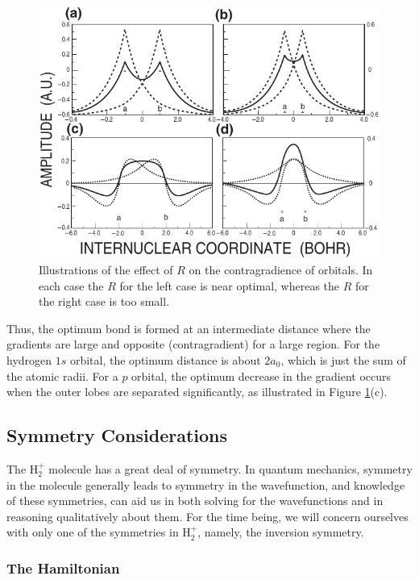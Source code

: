 \begin{figure}
\begin{center}
\includegraphics[scale=0.75]{fig2-11}
\end{center}
\caption{Illustrations of the effect of $R$ on the contragradience of
  orbitals. In each case the $R$ for the left case is near optimal,
  whereas the $R$ for the right case is too small.}
\label{fig2-11}
\end{figure}

Thus, the optimum bond is formed at an intermediate distance where the 
gradients are large and opposite (contragradient) for a large region. For 
the hydrogen $1s$ orbital, the optimum distance is about $2a_0$, which 
is just the sum of the atomic radii. For a $p$ orbital,
the optimum decrease in the gradient occurs when the outer lobes are separated
significantly, as illustrated in Figure \ref{fig2-11}(c).

\subsection{Symmetry Considerations}

The H$^+_2$ molecule has a great deal of symmetry. In quantum mechanics,
symmetry in the molecule generally leads to symmetry in the wavefunction, and
knowledge of these symmetries, can aid us in both solving for the 
wavefunctions and in reasoning qualitatively about them. For the time being, 
we will concern ourselves with only one of the symmetries in H$^+_2$, 
namely, the inversion symmetry.

\subsubsection{The Hamiltonian}
    
